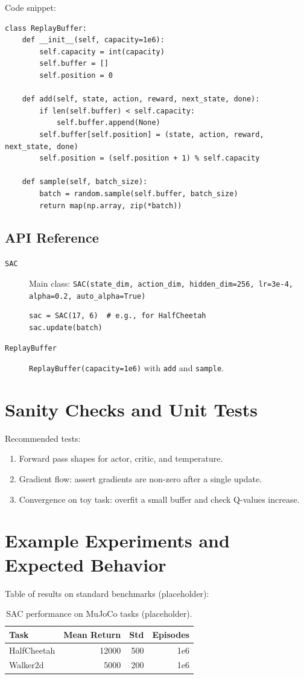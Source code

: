 \documentclass[11pt,a4paper]{article}
\begin{document}
Code snippet:
\begin{lstlisting}
class ReplayBuffer:
    def __init__(self, capacity=1e6):
        self.capacity = int(capacity)
        self.buffer = []
        self.position = 0
    
    def add(self, state, action, reward, next_state, done):
        if len(self.buffer) < self.capacity:
            self.buffer.append(None)
        self.buffer[self.position] = (state, action, reward, next_state, done)
        self.position = (self.position + 1) % self.capacity
    
    def sample(self, batch_size):
        batch = random.sample(self.buffer, batch_size)
        return map(np.array, zip(*batch))
\end{lstlisting}

\subsection{API Reference}
\begin{description}
  \item[\texttt{SAC}] Main class: \texttt{SAC(state\_dim, action\_dim, hidden\_dim=256, lr=3e-4, alpha=0.2, auto\_alpha=True)}
  \begin{lstlisting}
sac = SAC(17, 6)  # e.g., for HalfCheetah
sac.update(batch)
  \end{lstlisting}

  \item[\texttt{ReplayBuffer}] \texttt{ReplayBuffer(capacity=1e6)} with \texttt{add} and \texttt{sample}.
\end{description}

\section{Sanity Checks and Unit Tests}
Recommended tests:
\begin{enumerate}
  \item Forward pass shapes for actor, critic, and temperature.
  \item Gradient flow: assert gradients are non-zero after a single update.
  \item Convergence on toy task: overfit a small buffer and check Q-values increase.
\end{enumerate}

\section{Example Experiments and Expected Behavior}
Table of results on standard benchmarks (placeholder):
\begin{table}[H]
\centering
\caption{SAC performance on MuJoCo tasks (placeholder).}
\begin{tabular}{lrrr}
\toprule
Task & Mean Return & Std & Episodes \\
\midrule
HalfCheetah & 12000 & 500 & 1e6 \\
Walker2d & 5000 & 200 & 1e6 \\
\bottomrule
\end{tabular}
\end{table}
\end{document}
